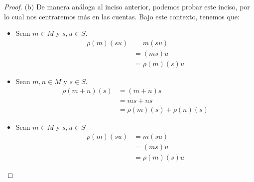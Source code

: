 \documentclass{article}
\newcommand{\lrprth}[1]{
	\left(#1\right)
}
\theoremstyle{definition}
\theoremstyle{plain}
\theoremstyle{plain}
\theoremstyle{definition}
\theoremstyle{definition}
\theoremstyle{definition}
\theoremstyle{definition}
\theoremstyle{definition}
\theoremstyle{definition}
\begin{document}
\begin{enumerate}[label=\textbf{Ej \arabic*.}]
\begin{proof}
	$\boxed{\text{(b)}}$ De manera análoga al inciso anterior, podemos probar este inciso, por lo cual nos centraremos más en las cuentas. Bajo este contexto, tenemos que:
	\begin{itemize}
		\item Sean $m \in M$ y $s,u \in S$.
		\begin{align*}
			\rho\lrprth{m}\lrprth{su}&=m\lrprth{su}\\
			&=\lrprth{ms}u\\
			&=\rho\lrprth{m}\lrprth{s}u
		\end{align*}
		\item Sean $m,n \in M$ y $s \in S$.
		\begin{align*}
			\rho\lrprth{m+n}\lrprth{s}&=\lrprth{m+n}s\\
			&=ms+ns\\
			&=\rho\lrprth{m}\lrprth{s}+\rho\lrprth{n}\lrprth{s}
		\end{align*}
		\item Sean $m \in M$ y $s,u \in S$
		\begin{align*}
			\rho\lrprth{m}\lrprth{su}&=m\lrprth{su}\\
			&=\lrprth{ms}u\\
			&=\rho\lrprth{m}\lrprth{s}u
		\end{align*}
	\end{itemize}
	

\end{proof}
\end{enumerate}
\end{document}
